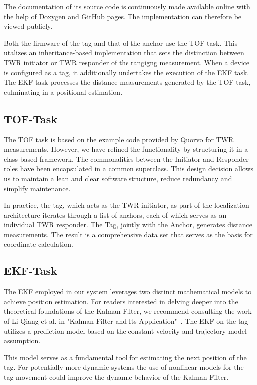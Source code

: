 \documentclass[conference, a4paper]{IEEEtran}
\begin{document}
The documentation of its source code is continuously made available online with the help of Doxygen and GitHub pages.
The implementation can therefore be viewed publicly\cite{doxygen-doku}.

Both the firmware of the tag and that of the anchor use the \ac{TOF} task.
This utalizes an inheritance-based implementation that sets the distinction between \ac{TWR} initiator or \ac{TWR} responder of the rangigng measurement.
When a device is configured as a tag,
it additionally undertakes the execution of the \ac{EKF} task.
The \ac{EKF} task processes the distance measurements generated by the \ac{TOF} task,
culminating in a positional estimation.

\subsection{TOF-Task}\label{section:firmware-tof}
The \ac{TOF} task is based on the example code
provided by Quorvo for \ac{TWR} measurements.
However, we have refined the functionality by structuring it in a class-based framework.
The commonalities between the Initiator and Responder roles have been
encapsulated in a common superclass.
This design decision allows us to maintain a lean and clear software structure,
reduce redundancy and simplify maintenance.

In practice, the tag, which acts as the \ac{TWR} initiator, as part of the localization architecture iterates through a list of anchors, each of which serves as an individual \ac{TWR} responder. 
The Tag, jointly with the Anchor, generates distance measurements. 
The result is a comprehensive data set that serves as the basis for coordinate calculation. 

\subsection{EKF-Task}\label{section:firmware-ekf}
The \ac{EKF} employed in our system leverages two distinct mathematical models
to achieve position estimation.
For readers interested in delving deeper into the theoretical foundations of the
Kalman Filter, we recommend consulting the work of Li Qiang et al. in
"Kalman Filter and Its Application"~\cite{Kalman}.
The EKF  on the tag utilizes a prediction model based on the constant velocity and trajectory model assumption.

This model serves as a fundamental tool for estimating the next position of the tag.
For potentially more dynamic systems the use of nonlinear models
for the tag movement could improve the dynamic behavior of the Kalman Filter.
\end{document}
